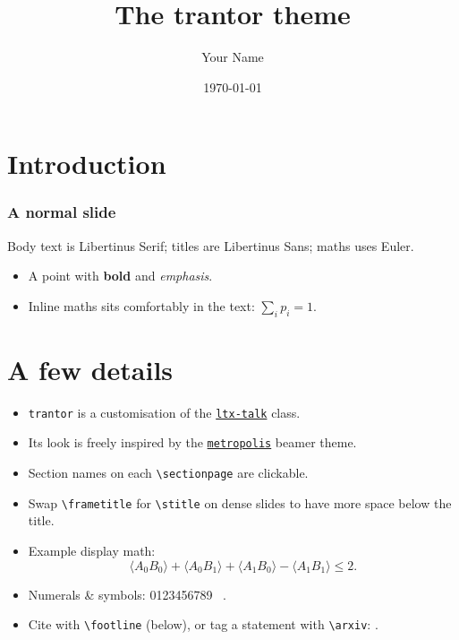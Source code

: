 \documentclass{ltx-talk}  %
\title{The trantor theme}
\author{Your Name}
\institute{Your affiliation}
\date{\today}
\begin{document}
\maketitle

\section{Introduction}\sectionpage

\begin{frame}
\frametitle{A normal slide}
  Body text is Libertinus Serif; titles are Libertinus Sans; maths uses Euler.
  \begin{itemize}
    \item A point with \textbf{bold} and \emph{emphasis}.
    \item Inline maths sits comfortably in the text: $\sum_i p_i = 1$.
  \end{itemize}
\end{frame}

\section{A few details}\sectionpage

\begin{frame}
  \begin{itemize}
      \item \texttt{trantor} is a customisation of the
         \href{https://ctan.org/pkg/ltx-talk}{\textcolor{accent}{\texttt{ltx-talk}}} class.
      \item Its look is freely inspired by the
         \href{https://ctan.org/pkg/beamertheme-metropolis}{\textcolor{accent}{\texttt{metropolis}}} beamer theme.
      \item Section names on each \texttt{\textbackslash sectionpage} are clickable.
      \item Swap \texttt{\textbackslash frametitle} for
         \texttt{\textbackslash stitle} on dense slides to have more
         space below the title.
       \item Example display math: \[
         \langle A_0 B_0 \rangle + \langle A_0 B_1\rangle + 
         \langle A_1 B_0\rangle - \langle A_1 B_1\rangle \le 2 .
         \]
       \item Numerals \& symbols: 0123456789 \yes\ \no.
       \item Cite with \texttt{\textbackslash footline} (below), or tag a statement with \texttt{\textbackslash arxiv}: .
  \end{itemize}

\end{frame}
\end{document}
